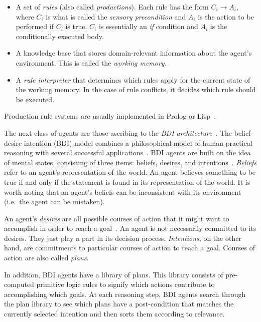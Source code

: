 \begin{itemize}

    \item A set of \textit{rules} (also called \textit{productions}).
        Each rule has the form $ C_i \rightarrow A_i $,
        where $ C_i $ is what is called the \textit{sensory precondition}
        and $ A_i $ is the action to be performed if $ C_i $ is true.
        $ C_i $ is essentially an \textit{if} condition and $ A_i $ is the conditionally executed body.

    \item A knowledge base that stores domain-relevant information about the agent's environment.
        This is called the \textit{working memory}.

    \item A \textit{rule interpreter} that determines which rules apply for the current state of the working memory.
        In the case of rule conflicts, it decides which rule should be executed.

\end{itemize}


Production rule systems are usually implemented in Prolog or Lisp~\citep{balke_how_2014}.

The next class of agents are those ascribing to the \textit{BDI architecture}~\citep{balke_how_2014}.
The belief-desire-intention (BDI) model combines a philosophical model of human practical reasoning
with several successful applications~\citep{georgeff_belief-desire-intention_1999}.
BDI agents are built on the idea of mental states,
consisting of three items: beliefs, desires, and intentions~\citep{balke_how_2014}.
\textit{Beliefs} refer to an agent's representation of the world.
An agent believes something to be true if and only if the statement is found in its representation of the world.
It is worth noting that an agent's beliefs can be inconsistent with its environment (i.e.~the agent can be mistaken).

An agent's \textit{desires} are all possible courses of action that it might want to accomplish in order to reach a goal~\citep{balke_how_2014}.
An agent is not necessarily committed to its desires.
They just play a part in its decision process.
\textit{Intentions}, on the other hand, are commitments to particular courses of action to reach a goal.
Courses of action are also called \textit{plans}.

In addition, BDI agents have a library of plans.
This library consists of pre-computed primitive logic rules to signify which actions contribute to accomplishing which goals.
At each reasoning step, BDI agents search through the plan library to see which plans have a post-condition that matches the currently selected intention
and then sorts them according to relevance.

